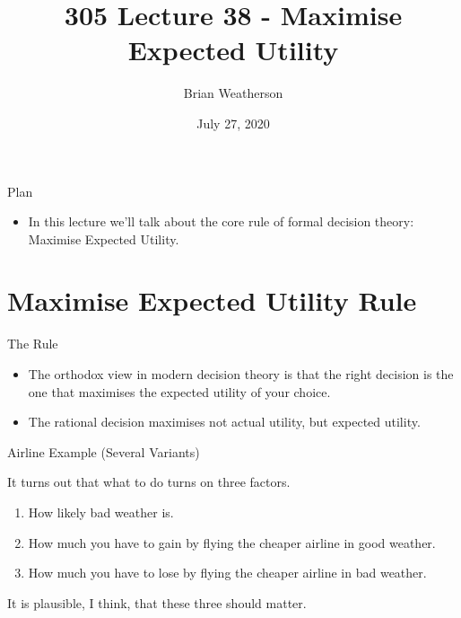 \documentclass[
  ignorenonframetext,
]{beamer}
\title{305 Lecture 38 - Maximise Expected Utility}
\author{Brian Weatherson}
\date{July 27, 2020}
\providecommand{\tightlist}{%
  \setlength{\itemsep}{0pt}\setlength{\parskip}{0pt}}
\renewcommand{\,}{\text{, }}
\begin{document}
\frame{\titlepage}

\begin{frame}{Plan}
\protect\hypertarget{plan}{}

\begin{itemize}
\tightlist
\item
  In this lecture we'll talk about the core rule of formal decision
  theory: Maximise Expected Utility.
\end{itemize}

\end{frame}

\hypertarget{maximise-expected-utility-rule}{%
\section{Maximise Expected Utility
Rule}\label{maximise-expected-utility-rule}}

\begin{frame}{The Rule}
\protect\hypertarget{the-rule}{}

\begin{itemize}
\tightlist
\item
  The orthodox view in modern decision theory is that the right decision
  is the one that maximises the expected utility of your choice.
\item
  The rational decision maximises not actual utility, but expected
  utility.
\end{itemize}

\end{frame}

\begin{frame}{Airline Example (Several Variants)}
\protect\hypertarget{airline-example-several-variants}{}

It turns out that what to do turns on three factors.

\begin{enumerate}
\tightlist
\item
  How likely bad weather is.
\item
  How much you have to gain by flying the cheaper airline in good
  weather.
\item
  How much you have to lose by flying the cheaper airline in bad
  weather.
\end{enumerate}

It is plausible, I think, that these three should matter.

\end{frame}
\end{document}
